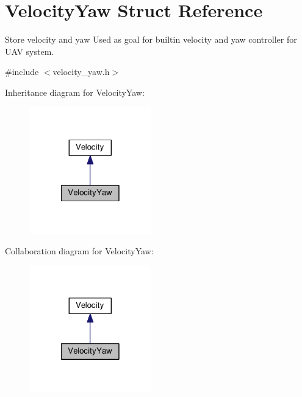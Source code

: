 \hypertarget{structVelocityYaw}{\section{Velocity\-Yaw Struct Reference}
\label{structVelocityYaw}
}


Store velocity and yaw Used as goal for builtin velocity and yaw controller for U\-A\-V system.  




{\ttfamily \#include $<$velocity\-\_\-yaw.\-h$>$}



Inheritance diagram for Velocity\-Yaw\-:\nopagebreak
\begin{figure}[H]
\begin{center}
\leavevmode
\includegraphics[width=150pt]{structVelocityYaw__inherit__graph}
\end{center}
\end{figure}


Collaboration diagram for Velocity\-Yaw\-:\nopagebreak
\begin{figure}[H]
\begin{center}
\leavevmode
\includegraphics[width=150pt]{structVelocityYaw__coll__graph}
\end{center}
\end{figure}
